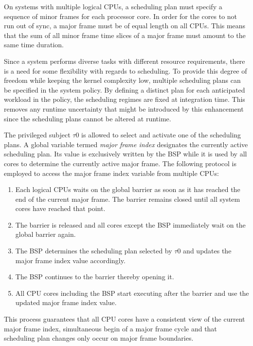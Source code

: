 On systems with multiple logical CPUs, a scheduling plan must specify a sequence
of minor frames for each processor core. In order for the cores to not run out
of sync, a major frame must be of equal length on all CPUs. This means that the
sum of all minor frame time slices of a major frame must amount to the same time
duration.

Since a system performs diverse tasks with different resource requirements,
there is a need for some flexibility with regards to scheduling. To provide this
degree of freedom while keeping the kernel complexity low, multiple scheduling
plans can be specified in the system policy. By defining a distinct plan for
each anticipated workload in the policy, the scheduling regimes are fixed at
integration time. This removes any runtime uncertainty that might be introduced
by this enhancement since the scheduling plans cannot be altered at runtime.

The privileged subject $\tau$0 is allowed to select and activate one of the
scheduling plans. A global variable termed \emph{major frame index} designates
the currently active scheduling plan. Its value is exclusively written by the
BSP while it is used by all cores to determine the currently active major frame.
The following protocol is employed to access the major frame index variable from
multiple CPUs:

\begin{enumerate}
	\item Each logical CPUs waits on the global barrier as soon as it has
		reached the end of the current major frame. The barrier remains closed
		until all system cores have reached that point.
	\item The barrier is released and all cores except the BSP immediately wait
		on the global barrier again.
	\item The BSP determines the scheduling plan selected by $\tau$0 and updates
		the major frame index value accordingly.
	\item The BSP continues to the barrier thereby opening it.
	\item All CPU cores including the BSP start executing after the barrier and
		use the updated major frame index value.
\end{enumerate}

This process guarantees that all CPU cores have a consistent view of the current
major frame index, simultaneous begin of a major frame cycle and that scheduling
plan changes only occur on major frame boundaries.
